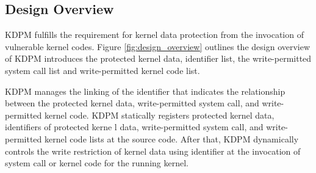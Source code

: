 



\subsection{Design Overview}

KDPM fulfills the requirement for kernel data protection from the invocation of
vulnerable kernel codes. 
%
Figure \ref{fig:design_overview} outlines the design overview of 
%
KDPM introduces the protected kernel data, identifier list, the
write-permitted system call list and write-permitted kernel code list.

%
KDPM manages the linking of the identifier that indicates the relationship between
the protected kernel data, write-permitted system call, and write-permitted kernel
code.
%
KDPM statically registers protected kernel data, identifiers of protected kerne
l data, write-permitted system call, and write-permitted kernel code lists at
the source code. After that, KDPM dynamically controls the write restriction of
kernel data using identifier at the invocation of system call or kernel code for
the running kernel.

